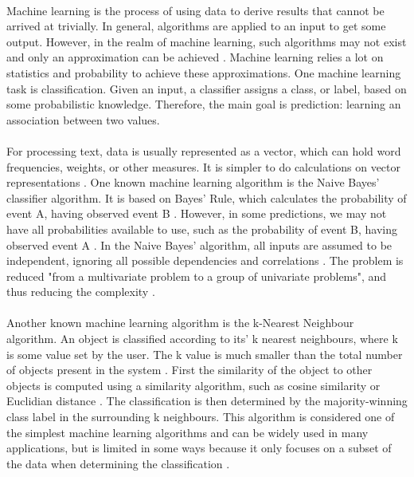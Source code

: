 \documentclass[11pt,titlepage]{report}
\begin{document}
\paragraph{}
Machine learning is the process of using data to derive results that cannot be arrived at trivially. In general, algorithms are applied to an input to get some output. However, in the realm of machine learning, such algorithms may not exist and only an approximation can be achieved \cite{alpaydin}. Machine learning relies a lot on statistics and probability to achieve these approximations. One machine learning task is classification. Given an input, a classifier assigns a class, or label, based on some probabilistic knowledge. Therefore, the main goal is prediction: learning an association between two values.
\paragraph{}
For processing text, data is usually represented as a vector, which can hold word frequencies, weights, or other measures. It is simpler to do calculations on vector representations \cite{smola}. One known machine learning algorithm is the Naive Bayes' classifier algorithm. It is based on Bayes' Rule, which calculates the probability of event A, having observed event B \cite{alpaydin}. However, in some predictions, we may not have all probabilities available to use, such as the probability of event B, having observed event A \cite{smola}. In the Naive Bayes' algorithm, all inputs are assumed to be independent, ignoring all possible dependencies and correlations \cite{alpaydin}. The problem is reduced "from a multivariate problem to a group of univariate problems", and thus reducing the complexity \cite{alpaydin}. 
\paragraph{}
Another known machine learning algorithm is the k-Nearest Neighbour algorithm.  An object is classified according to its' k nearest neighbours, where k is some value set by the user. The k value is much smaller than the total number of objects present in the system \cite{alpaydin}. First the similarity of the object to other objects is computed using a similarity algorithm, such as cosine similarity or Euclidian distance \cite{torres}. The classification is then determined by the majority-winning class label in the surrounding k neighbours. This algorithm is considered one of the simplest machine learning algorithms and can be widely used in many applications, but is limited in some ways because it only focuses on a subset of the data when determining the classification \cite{nearest_neighbour}.
\end{document}
